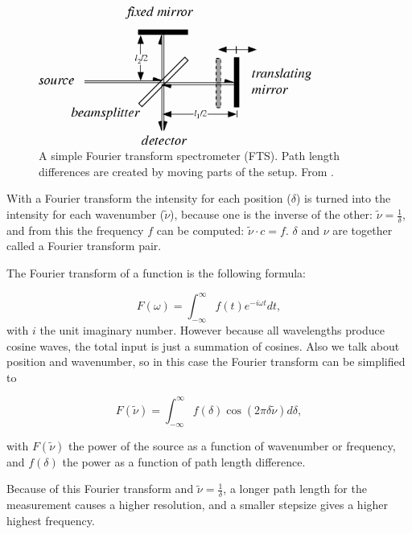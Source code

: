\begin{figure}
 \begin{center}
  \includegraphics[width=0.8\textwidth]{figures/fts.png}
  \caption{A simple Fourier transform spectrometer (FTS). Path length differences are created by moving parts of the setup.  From \cite{wolf}.}
  \label{fig:fts}
 \end{center}
\end{figure}


With a Fourier transform the intensity for each position ($\delta$) is turned into the intensity for each wavenumber ($\tilde{\nu}$), because one is the inverse of the other: $\tilde{\nu} = \frac{1}{\delta}$, and from this the frequency $f$ can be computed: $\tilde{\nu}\cdot c=f$. $\delta$ and $\nu$ are together called a Fourier transform pair.

The Fourier transform of a function is the following formula:

\[
 F(\omega)=\int_{-\infty}^{\infty}f(t)e^{-i\omega t}dt,
\]
with $i$ the unit imaginary number. However because all wavelengths produce cosine waves, the total input is just a summation of cosines. Also we talk about position and wavenumber, so in this case the Fourier transform can be simplified to

\[
 F(\tilde{\nu}) = \int_{-\infty}^{\infty}f(\delta)\cos(2\pi\delta\tilde{\nu})d\delta,
\]

with $F(\tilde{\nu})$ the power of the source as a function of wavenumber or frequency, and $f(\delta)$ the power as a function of path length difference.

Because of this Fourier transform and $\tilde{\nu} = \frac{1}{\delta}$, a longer path length for the measurement causes a higher resolution, and a smaller stepsize gives a higher highest frequency.

